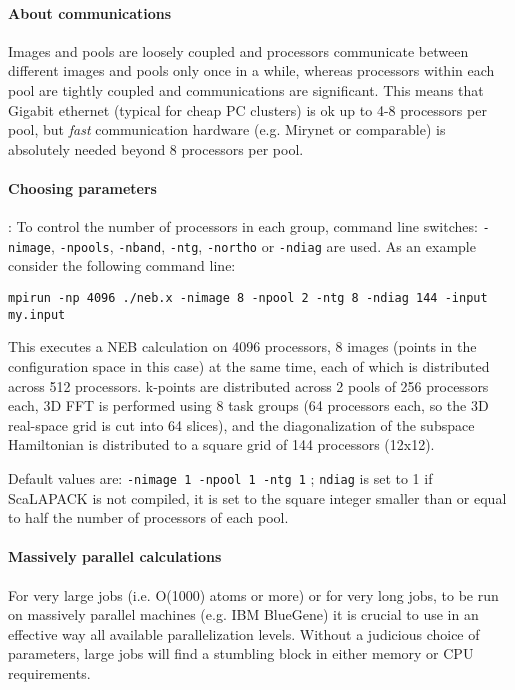 \documentclass[12pt,a4paper]{article}
\begin{document}
\paragraph{About communications}
Images and pools are loosely coupled and processors communicate
between different images and pools only once in a while, whereas
processors within each pool are tightly coupled and communications
are significant. This means that Gigabit ethernet (typical for
cheap PC clusters) is ok up to 4-8 processors per pool, but {\em fast}
communication hardware (e.g. Mirynet or comparable) is absolutely 
needed beyond 8 processors per pool.

\paragraph{Choosing parameters}:
To control the number of processors in each group,
command line switches: 
\texttt{-nimage}, \texttt{-npools}, \texttt{-nband},
\texttt{-ntg}, \texttt{-northo} or \texttt{-ndiag}
are used.
As an example consider the following command line:
\begin{verbatim}
mpirun -np 4096 ./neb.x -nimage 8 -npool 2 -ntg 8 -ndiag 144 -input my.input
\end{verbatim}
This executes a NEB calculation on 4096 processors, 8 images (points in the configuration
space in this case) at the same time, each of 
which is distributed across 512 processors.
k-points are distributed across 2 pools of 256 processors each, 
3D FFT is performed using 8 task groups (64 processors each, so
the 3D real-space grid is cut into 64 slices), and the diagonalization
of the subspace Hamiltonian is distributed to a square grid of 144
processors (12x12).

Default values are: \texttt{-nimage 1 -npool 1 -ntg 1} ; 
\texttt{ndiag} is set to 1 if ScaLAPACK is not compiled,
it is set to the square integer smaller than or equal to  half the number 
of processors of each pool.

\paragraph{Massively parallel calculations}
For very large jobs (i.e. O(1000) atoms or more) or for very long jobs,
to be run on massively parallel  machines (e.g. IBM BlueGene) it is
crucial to use in an effective way all available parallelization levels. Without a judicious choice of
parameters, large jobs will find a stumbling block in either memory or 
CPU requirements.
\end{document}
